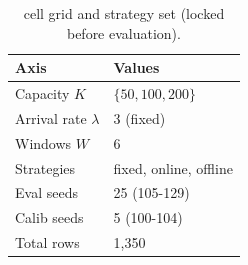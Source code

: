 \begin{table}[!t]
 \caption{cell grid and strategy set (locked before evaluation).}
 \label{tab:grid}
 \centering
 \small
 \setlength{\tabcolsep}{4pt}
 \begin{tabular}{@{}p{2.8cm}p{4.7cm}@{}}
 \toprule
 \textbf{Axis} & \textbf{Values} \\
 \midrule
 Capacity $K$ & $\{50, 100, 200\}$ \\
 Arrival rate $\lambda$ & 3 (fixed) \\
 Windows $W$ & 6 \\
 Strategies & fixed, online, offline \\
 Eval seeds & 25 (105-129) \\
 Calib seeds & 5 (100-104) \\
 \midrule
 Total rows & 1{,}350 \\
 \bottomrule
 \end{tabular}
\end{table}
